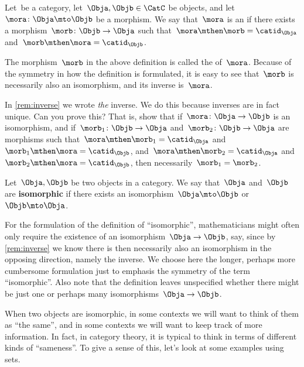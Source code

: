 \begin{ctdefinition}[Isomorphism]
  \label{def:isomorphism}
  Let~\CatC be a category, let~$\Obja,\Objb \in \CatC$ be objects, and let~$\mora \colon \Obja \mto \Objb$ be a morphism. We say that~$\mora$ is an \emph{} if there exists a morphism~$\morb\colon \Objb \to \Obja$ such that~$\mora \mthen \morb = \catid_{\Obja}$ and~$\morb \mthen \mora = \catid_{\Objb}$.
\end{ctdefinition}

\begin{remark}
  \label{rem:inverse}
  The morphism~$\morb$ in the above definition is called the \textbf{} of~$\mora$. Because of the symmetry in how the definition is formulated, it is easy to see that~$\morb$ is necessarily also an isomorphism, and its inverse is~$\mora$.
\end{remark}

\begin{exercise}
  In \cref{rem:inverse} we wrote \emph{the} inverse. We do this because inverses are in fact unique. Can you prove this?
  That is, show that if~$\mora \colon \Obja \to \Objb$ is an isomorphism, and if~$\morb_1\colon \Objb \to \Obja$ and~$\morb_2\colon \Objb \to \Obja$ are morphisms such that~$\mora \mthen \morb_1 = \catid_\Obja$ and~$\morb_1 \mthen \mora = \catid_\Objb$, and~$\mora \mthen \morb_2 = \catid_\Obja$ and~$\morb_2 \mthen \mora = \catid_\Objb$, then necessarily~$\morb_1 = \morb_2$.
\end{exercise}

\begin{ctdefinition}
  Let~$\Obja,\Objb$ be two objects in a category. We say that~$\Obja$ and~$\Objb$ are \textbf{isomorphic} if there exists an isomorphism~$\Obja \mto \Objb$ or~$\Objb \mto \Obja$.
\end{ctdefinition}

For the formulation of the definition of ``isomorphic'', mathematicians might often only require the existence of an isomorphism~$\Obja \to \Objb$, say, since by \cref{rem:inverse} we know there is then necessarily also an isomorphism in the opposing direction, namely the inverse. We choose here the longer, perhaps more cumbersome formulation just to emphasis the symmetry of the term ``isomorphic''. Also note that the definition leaves unspecified whether there might be just one or perhaps many isomorphisms~$\Obja \to \Objb$.

When two objects are isomorphic, in some contexts we will want to think of them as ``the same'', and in some contexts we will want to keep track of more information. In fact, in category theory, it is typical to think in terms of different kinds of ``sameness''. To give a sense of this, let's look at some examples using sets.

